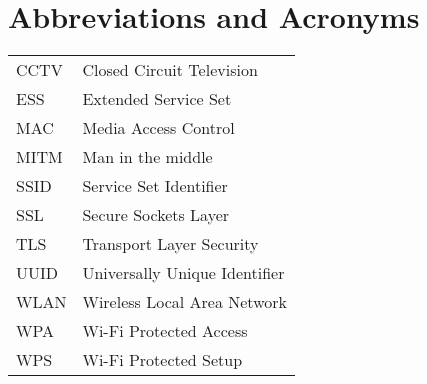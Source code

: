 \chapter*{Abbreviations and Acronyms}


\noindent
\begin{longtable}{@{}p{}p{}@{}}
CCTV & Closed Circuit Television \\
ESS & Extended Service Set \\
MAC & Media Access Control \\
MITM & Man in the middle \\
SSID & Service Set Identifier \\
SSL & Secure Sockets Layer \\
TLS & Transport Layer Security \\
UUID & Universally Unique Identifier \\
WLAN & Wireless Local Area Network \\
WPA & Wi-Fi Protected Access \\
WPS & Wi-Fi Protected Setup \\
\end{longtable}
